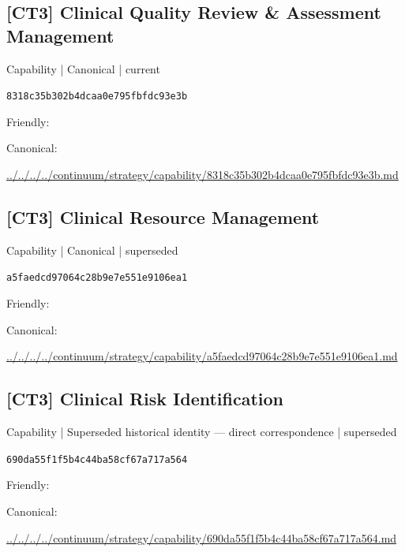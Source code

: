 \documentclass[10pt,a4paper]{article}
\begin{document}
\subsection*{[CT3] Clinical Quality Review \& Assessment Management}
{\small Capability | Canonical | current}\par
\texttt{8318c35b302b4dcaa0e795fbfdc93e3b}\par
Friendly: \par
Canonical: \par
{\footnotesize\url{../../../../continuum/strategy/capability/8318c35b302b4dcaa0e795fbfdc93e3b.md}}\par
\subsection*{[CT3] Clinical Resource Management}
{\small Capability | Canonical | superseded}\par
\texttt{a5faedcd97064c28b9e7e551e9106ea1}\par
Friendly: \par
Canonical: \par
{\footnotesize\url{../../../../continuum/strategy/capability/a5faedcd97064c28b9e7e551e9106ea1.md}}\par
\subsection*{[CT3] Clinical Risk Identification}
{\small Capability | Superseded historical identity — direct correspondence | superseded}\par
\texttt{690da55f1f5b4c44ba58cf67a717a564}\par
Friendly: \par
Canonical: \par
{\footnotesize\url{../../../../continuum/strategy/capability/690da55f1f5b4c44ba58cf67a717a564.md}}\par
\end{document}
